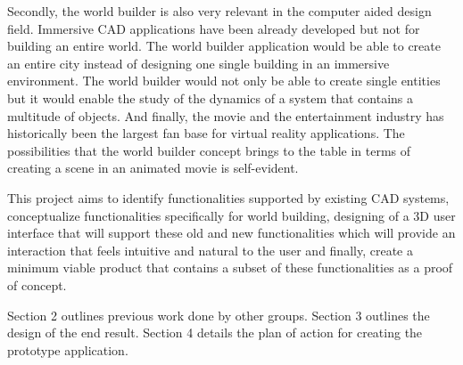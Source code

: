 Secondly, the world builder is also very relevant in the computer aided design field. Immersive CAD applications have been already developed but not for
building an entire world. The world builder application would be able to create an entire city instead of designing one single building in an immersive 
environment. The world builder would not only be able to create single entities but it would enable the study of the dynamics of a system that contains
a multitude of objects. And finally, the movie and the entertainment industry has historically been the largest fan base for virtual reality 
applications. The possibilities that the world builder concept brings to the table in terms of creating a scene in an animated movie is self-evident.


This project aims to identify functionalities supported by existing CAD systems, conceptualize functionalities specifically for world building, designing
of a 3D user interface that will support these old and new functionalities which will provide an interaction that feels intuitive and natural to the user
and finally, create a minimum viable product that contains a subset of these functionalities as a proof of concept.

Section 2 outlines previous work done by other groups.  
Section 3 outlines the design of the end result.
Section 4 details the plan of action for creating the prototype application.